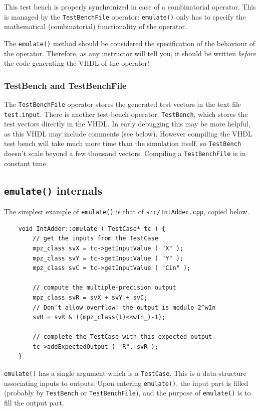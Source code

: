 \documentclass{article}
\begin{document}
This test bench is properly synchronized in case of a combinatorial
operator. This is managed by the \texttt{\small TestBenchFile} operator:
\texttt{\small emulate()} only has to specify the mathematical
(combinatorial) functionality of the operator.

The \texttt{\small emulate()} method should be considered  the specification of
the behaviour of the operator. Therefore, as any instructor will tell
you, it should be written \emph{before} the code generating the VHDL
of the operator!

\subsubsection{TestBench and TestBenchFile}
The \texttt{\small TestBenchFile} operator stores the generated test vectors in the text file \texttt{\small test.input}.
There is another test-bench operator, \texttt{\small TestBench}, which stores the test vectors directly in the VHDL. In early debugging this may be more helpful, as this VHDL may include comments (see below). However compiling the VHDL test bench will take much more time than the simulation itself, so \texttt{\small TestBench} doesn't scale beyond a few thousand vectors. Compiling a \texttt{\small TestBenchFile} is in constant time.




\subsection{\texttt{emulate()}  internals}
The simplest example of \texttt{\small emulate()} is that of \texttt{\small src/IntAdder.cpp}, copied below.
\begin{verbatim}
	void IntAdder::emulate ( TestCase* tc ) {
		// get the inputs from the TestCase
		mpz_class svX = tc->getInputValue ( "X" );
		mpz_class svY = tc->getInputValue ( "Y" );
		mpz_class svC = tc->getInputValue ( "Cin" );
		
		// compute the multiple-precision output
		mpz_class svR = svX + svY + svC;
		// Don't allow overflow: the output is modulo 2^wIn
		svR = svR & ((mpz_class(1)<<wIn_)-1);
		
		// complete the TestCase with this expected output
		tc->addExpectedOutput ( "R", svR );
	}
\end{verbatim}

\texttt{\small emulate()} has a single argument which is a
\texttt{\small TestCase}. This is a data-structure associating inputs to
outputs. Upon entering \texttt{\small emulate()}, the input part is filled
(probably by \texttt{\small TestBench} or \texttt{\small TestBenchFile}), and the
purpose of \texttt{\small emulate()} is to fill the output part.
\end{document}
